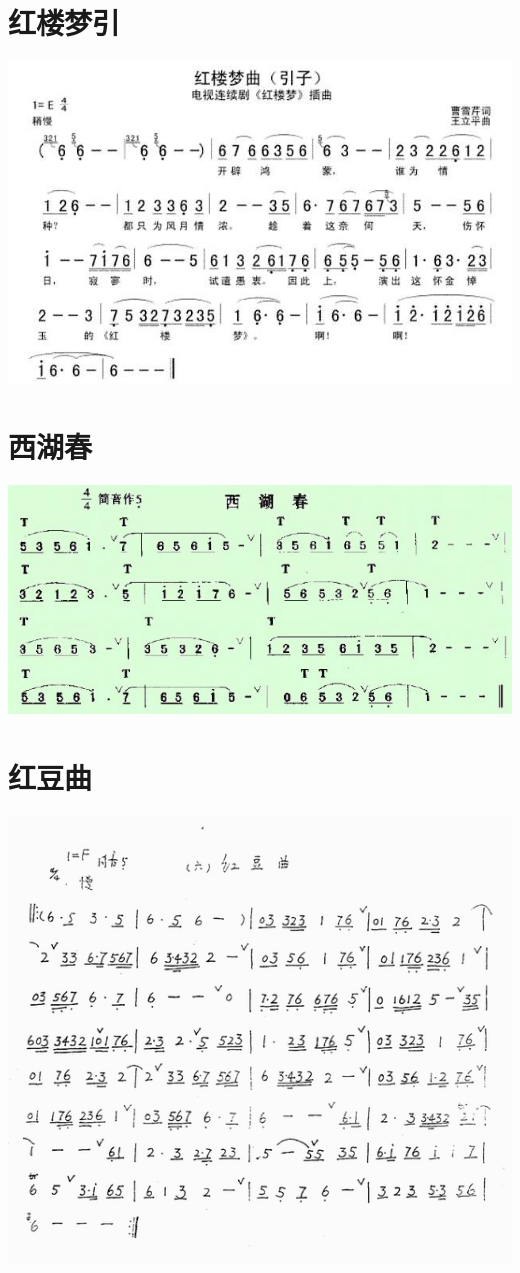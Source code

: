 \documentclass[cn,pad,chinese,chinesefont=nofont]{elegantbook}
\begin{document}
\section{红楼梦引}
    \includegraphics[width=\textwidth]{dongxiao/红楼梦引.jpg}
\section{西湖春}
    \includegraphics[width=\textwidth]{dongxiao/西湖春.jpg}
\section{红豆曲}
    \includegraphics[width=\textwidth]{dongxiao/红豆曲.jpg}
\end{document}
